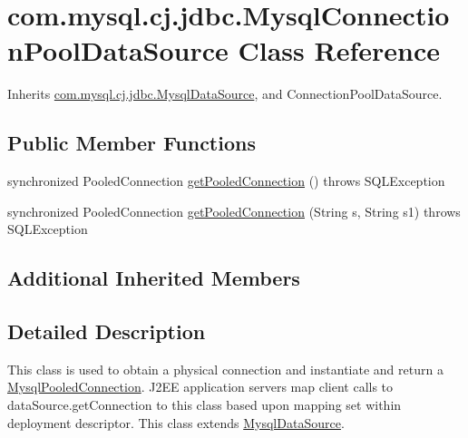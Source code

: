 \hypertarget{classcom_1_1mysql_1_1cj_1_1jdbc_1_1_mysql_connection_pool_data_source}{}\section{com.\+mysql.\+cj.\+jdbc.\+Mysql\+Connection\+Pool\+Data\+Source Class Reference}
\label{classcom_1_1mysql_1_1cj_1_1jdbc_1_1_mysql_connection_pool_data_source}


Inherits \mbox{\hyperlink{classcom_1_1mysql_1_1cj_1_1jdbc_1_1_mysql_data_source}{com.\+mysql.\+cj.\+jdbc.\+Mysql\+Data\+Source}}, and Connection\+Pool\+Data\+Source.

\subsection*{Public Member Functions}
\begin{DoxyCompactItemize}
\item 
synchronized Pooled\+Connection \mbox{\hyperlink{classcom_1_1mysql_1_1cj_1_1jdbc_1_1_mysql_connection_pool_data_source_a7de9afe8a9a4514f810aa226abb8fa7f}{get\+Pooled\+Connection}} ()  throws S\+Q\+L\+Exception 
\item 
synchronized Pooled\+Connection \mbox{\hyperlink{classcom_1_1mysql_1_1cj_1_1jdbc_1_1_mysql_connection_pool_data_source_afd5aea7cfab2ff2787bdf918d6ac8f8c}{get\+Pooled\+Connection}} (String s, String s1)  throws S\+Q\+L\+Exception 
\end{DoxyCompactItemize}
\subsection*{Additional Inherited Members}


\subsection{Detailed Description}
This class is used to obtain a physical connection and instantiate and return a \mbox{\hyperlink{classcom_1_1mysql_1_1cj_1_1jdbc_1_1_mysql_pooled_connection}{Mysql\+Pooled\+Connection}}. J2\+EE application servers map client calls to data\+Source.\+get\+Connection to this class based upon mapping set within deployment descriptor. This class extends \mbox{\hyperlink{classcom_1_1mysql_1_1cj_1_1jdbc_1_1_mysql_data_source}{Mysql\+Data\+Source}}. 

